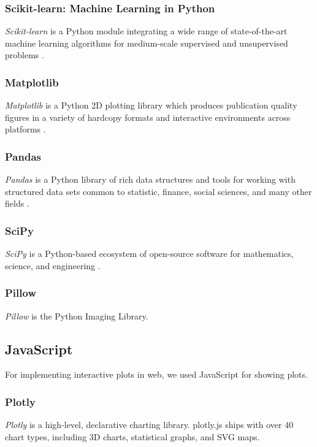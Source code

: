 \documentclass[aps, 10pt, a4paper]{article}
\begin{document}
            \subsubsection{Scikit-learn: Machine Learning in Python}
                \textit{Scikit-learn} is a Python module integrating a wide range of state-of-the-art machine learning algorithms for medium-scale supervised and unsupervised problems \cite{ref:sklearn1}.
                
            \subsubsection{Matplotlib}
                \textit{Matplotlib} is a Python 2D plotting library which produces publication quality figures in a variety of hardcopy formats and interactive environments across platforms \cite{ref:matplotlib1}.
                
            \subsubsection{Pandas}
                \textit{Pandas} is a Python library of rich data structures and tools for working with structured data sets common to statistic, finance, social sciences, and many other fields \cite{ref:pandas1}.
                
            \subsubsection{SciPy}
                \textit{SciPy} is a Python-based ecosystem of open-source software for mathematics, science, and engineering \cite{ref:scipy1}.
                
            \subsubsection{Pillow}
                \textit{Pillow} is the Python Imaging Library. \cite{ref:pil1}
                
         \subsection{JavaScript}
            For implementing interactive plots in web, we used JavaScript for showing plots. 
            
            \subsubsection{Plotly}
                \textit{Plotly} is a high-level, declarative charting library. plotly.js ships with over 40 chart types, including 3D charts, statistical graphs, and SVG maps. \cite{ref:plotly1}
                
\end{document}
